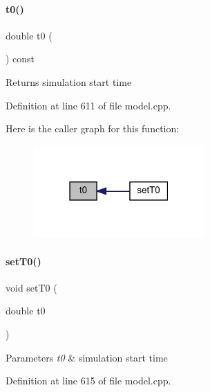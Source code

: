 \paragraph{\texorpdfstring{t0()}{t0()}}
{\footnotesize\ttfamily double t0 (\begin{DoxyParamCaption}{ }\end{DoxyParamCaption}) const}

\begin{DoxyReturn}{Returns}
simulation start time 
\end{DoxyReturn}


Definition at line 611 of file model.\+cpp.

Here is the caller graph for this function\+:
\nopagebreak
\begin{figure}[H]
\begin{center}
\leavevmode
\includegraphics[width=186pt]{classamici_1_1_model_a223e567004c82b5facc2fe98cdd16855_icgraph}
\end{center}
\end{figure}
\mbox{\label{classamici_1_1_model_aaf5053fde7e205c89d89c000a7693987}} 
\paragraph{\texorpdfstring{set\+T0()}{setT0()}}
{\footnotesize\ttfamily void set\+T0 (\begin{DoxyParamCaption}\item[{double}]{t0 }\end{DoxyParamCaption})}


\begin{DoxyParams}{Parameters}
{\em t0} & simulation start time \\
\hline
\end{DoxyParams}


Definition at line 615 of file model.\+cpp.

